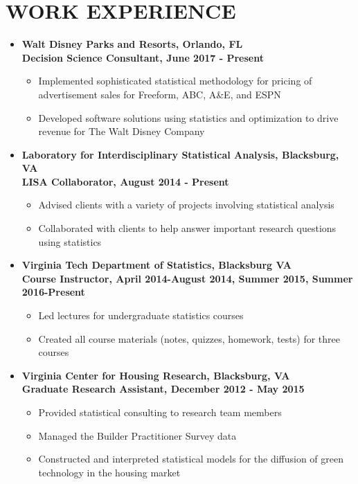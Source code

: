 \documentclass[10pt]{article}
\begin{document}
\section*{WORK EXPERIENCE}
\begin{itemize}
\item[] \textbf{Walt Disney Parks and Resorts, Orlando, FL\\
Decision Science Consultant, June 2017 - Present}
\begin{itemize}
\item Implemented sophisticated statistical methodology for pricing of advertisement sales for Freeform, ABC, A\&E, and ESPN
\item Developed software solutions using statistics and optimization to drive revenue for The Walt Disney Company
\end{itemize}

\item[] \textbf{Laboratory for Interdisciplinary Statistical Analysis, Blacksburg, VA\\
LISA Collaborator, August 2014 - Present}
\begin{itemize}
\item Advised clients with a variety of projects involving statistical analysis
\item Collaborated with clients to help answer important research questions using statistics 
\end{itemize}


\item[] \textbf{Virginia Tech Department of Statistics, Blacksburg VA\\
Course Instructor, April 2014-August 2014, Summer 2015, Summer 2016-Present}
\begin{itemize}
\item Led lectures for undergraduate statistics courses
\item Created all course materials (notes, quizzes, homework, tests) for three courses
\end{itemize} 
 
 
\item[] \textbf{Virginia Center for Housing Research, Blacksburg, VA\\
Graduate Research Assistant, December 2012 - May 2015}
\begin{itemize} 
\item Provided statistical consulting to research team members
\item Managed the Builder Practitioner Survey data
\item Constructed and interpreted statistical models for the diffusion of green technology in the housing market
\end{itemize} 


\end{itemize}
\end{document}
